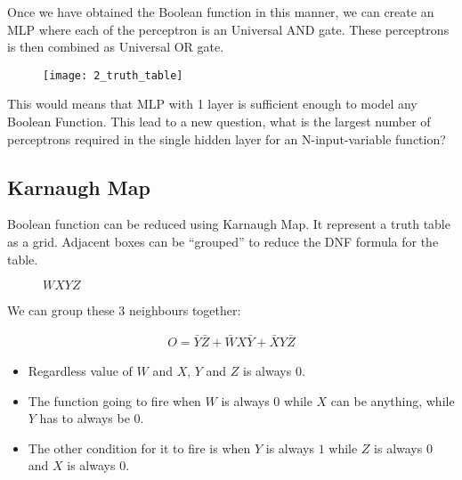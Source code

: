 \hfill\break
Once we have obtained the Boolean function in this manner, we can create an MLP where each of the perceptron is an Universal AND gate. These perceptrons is then combined as Universal OR gate.


\begin{figure}[H]
	\centering
	\texttt{[image: 2\_truth\_table]}
\end{figure}

\hfill\break
This would means that MLP with 1 layer is sufficient enough to model any Boolean Function. This lead to a new question, what is the largest number of perceptrons required in the single hidden layer for an N-input-variable function?

\subsection{Karnaugh Map}
Boolean function can be reduced using Karnaugh Map. It represent a truth table as a grid. Adjacent boxes can be ``grouped'' to reduce the DNF formula for the table.


\begin{figure}[H]
	\centering
	\begin{Karnaugh}{$WX$}{$YZ$}
	\end{Karnaugh}
\end{figure}

\hfill\break
We can group these 3 neighbours together:

\begin{align}
	O = \bar{Y}\bar{Z} + \bar{W}X\bar{Y} + \bar{X}Y\bar{Z}
\end{align}

\begin{itemize}
	\item Regardless value of $W$ and $X$, $Y$ and $Z$ is always $0$.
	\item The function going to fire when $W$ is always $0$ while $X$ can be anything, while $Y$ has to always be $0$.
	\item The other condition for it to fire is when $Y$ is always $1$ while $Z$ is always $0$ and $X$ is always $0$.
\end{itemize}


